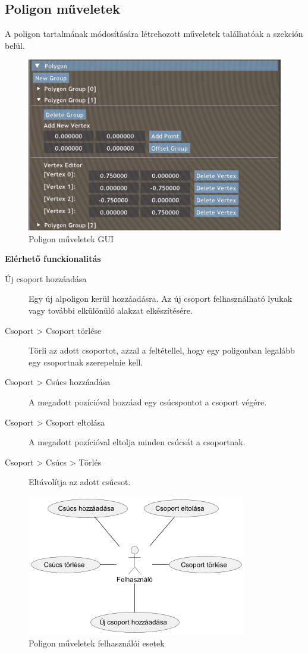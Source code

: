 \subsection{Poligon műveletek}

A poligon tartalmának módosítására létrehozott műveletek találhatóak a szekción belül.

\begin{figure}[H]
    \centering
    \includegraphics[width=0.85\linewidth]{images/polygon_actions.png}
    \caption{Poligon műveletek GUI}
    \label{fig:polygon_actions-1}
\end{figure}

\textbf{Elérhető funckionalitás}

\begin{description}
    \item[Új csoport hozzáadása] Egy új alpoligon kerül hozzáadásra. Az új csoport felhasználható lyukak vagy további elkülönülő alakzat elkészítésére.
    \item[Csoport > Csoport törlése] Törli az adott csoportot, azzal a feltétellel, hogy egy poligonban legalább egy csoportnak szerepelnie kell.
    \item[Csoport > Csúcs hozzáadása] A megadott pozícióval hozzáad egy csúcspontot a csoport végére.
    \item[Csoport > Csoport eltolása] A megadott pozícióval eltolja minden csúcsát a csoportnak.
    \item[Csoport > Csúcs > Törlés] Eltávolítja az adott csúcsot.
\end{description}

\begin{figure}[H]
    \centering
    \includegraphics[width=.6\linewidth]{images/usecase_polygon_actions.png}
    \caption{Poligon műveletek felhasználói esetek}
    \label{fig:usecase_polygon_actions-1}
\end{figure}

